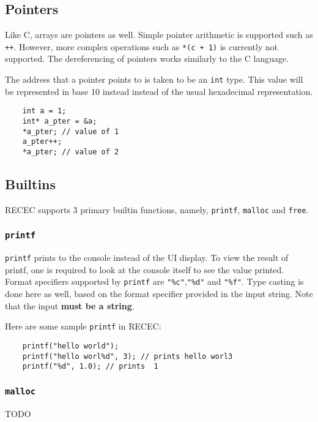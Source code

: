 \documentclass[a4paper]{article}
\begin{document}
\subsection{Pointers}

Like C, arrays are pointers as well. Simple pointer arithmetic is supported such as \texttt{++}. However, more complex operations such as \texttt{*(c + 1)} is currently not supported. The dereferencing of pointers works similarly to the C language. 

The address that a pointer points to is taken to be an \texttt{int} type. This value will be represented in base 10 instead instead of the usual hexadecimal representation. 

\begin{verbatim}
	int a = 1;
	int* a_pter = &a;
	*a_pter; // value of 1
	a_pter++;
	*a_pter; // value of 2
\end{verbatim}

\subsection{Builtins}

RECEC supports 3 primary builtin functions, namely, \texttt{printf}, \texttt{malloc} and \texttt{free}.

\subsubsection{\texttt{printf}}

\texttt{printf} prints to the console instead of the UI display. To view the result of printf, one is required to look at the console itself to see the value printed. Format specifiers supported by \texttt{printf} are \texttt{"\%c"},\texttt{"\%d"} and \texttt{"\%f"}. Type casting is done here as well, based on the format specifier provided in the input string. Note that the input \textbf{must be a string}. 

Here are some sample \texttt{printf} in RECEC:
\begin{verbatim}
	printf("hello world");
	printf("hello worl%d", 3); // prints hello worl3
	printf("%d", 1.0); // prints  1
\end{verbatim}

\subsubsection{\texttt{malloc}}

TODO
\end{document}
